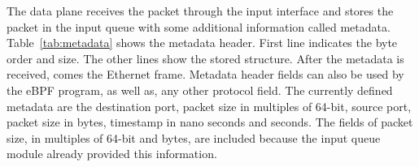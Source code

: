 

The data plane receives the packet through the input interface and stores the packet in the input queue with some additional information called metadata.
Table~\ref{tab:metadata} shows the metadata header. First line indicates the byte order and size. The other lines show the stored structure.
After the metadata is received, comes the Ethernet frame. Metadata header fields can also be used by the eBPF program, as well as, any other protocol field. The currently defined metadata are the destination port, packet size in multiples of 64-bit, source port, packet size in bytes, timestamp in nano seconds and seconds. The fields of packet size, in multiples of 64-bit and bytes, are included because the input queue module already provided this information.

